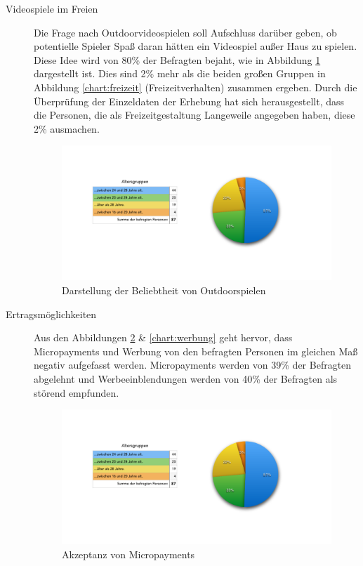 \begin{description}
\item[Videospiele im Freien] 
Die Frage nach Outdoorvideospielen soll Aufschluss darüber geben, ob potentielle Spieler Spaß daran hätten ein Videospiel außer Haus zu spielen. Diese Idee wird von 80\% der Befragten bejaht, wie in Abbildung \ref{chart:outdoor} dargestellt ist. Dies sind 2\% mehr als die beiden großen Gruppen in Abbildung \ref{chart:freizeit} (Freizeitverhalten) zusammen ergeben. Durch die Überprüfung der Einzeldaten der Erhebung hat sich herausgestellt, dass die Personen, die als Freizeitgestaltung Langeweile angegeben haben, diese 2\% ausmachen.




\begin{figure}[H]
    \centering
    \includegraphics[trim=40 75 30 70,clip,width=1.2\textwidth, page=7]{files/statistik/umfrage1Ergebnisse.pdf}
    \caption{Darstellung der Beliebtheit von Outdoorspielen}
    \label{chart:outdoor}
\end{figure}


\item[Ertragsmöglichkeiten]

Aus den Abbildungen \ref{chart:micropayments} \& \ref{chart:werbung} geht hervor, dass Micropayments und Werbung von den befragten Personen im gleichen Maß negativ aufgefasst werden. Micropayments werden von 39\% der Befragten abgelehnt und Werbeeinblendungen werden von 40\% der Befragten als störend empfunden.

\begin{figure}[H]
    \centering
    \includegraphics[trim=40 75 30 70,clip,width=1.2\textwidth, page=9]{files/statistik/umfrage1Ergebnisse.pdf}
    \caption{Akzeptanz von Micropayments}
    \label{chart:micropayments}
\end{figure}



\end{description}
